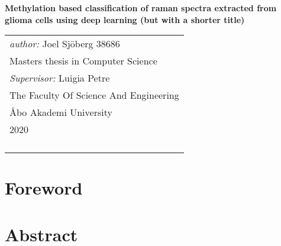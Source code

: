 \documentclass[a4paper, 12pt, oneside]{book}
\begin{document}
\pagestyle{empty}    
\begingroup
{}


\begin{titlepage}
\vspace*{144pt}
\begin{center}
\Huge\bf Methylation based classification of raman spectra extracted from glioma cells using deep learning (but with a shorter title) %


\end{center}
\enlargethispage{3cm}
\vfill

\hfill
\begin{tabular}[t]{l@{}}%
\textit{author:} Joel Sjöberg 38686\\ %
Masters thesis in Computer Science\\ %
\textit{Supervisor:} Luigia Petre\\ %
The Faculty Of Science And Engineering\\ %
Åbo Akademi University\\ 
2020\\ %
\\
\\
\\
\\
\end{tabular}
\end{titlepage}


\tableofcontents 


\endgroup %

\clearpage
\pagestyle{plain}      
\chapter*{Foreword}


\chapter*{Abstract}

\end{document}
